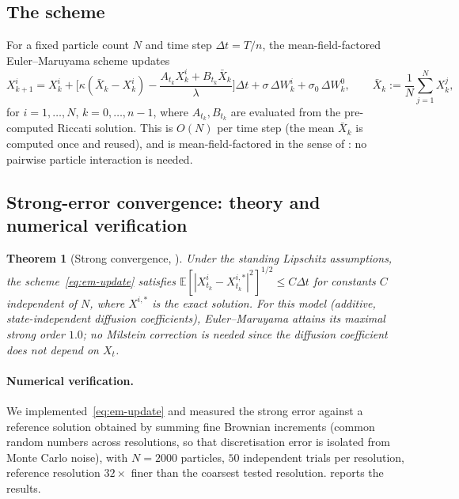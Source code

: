 \documentclass[11pt]{article}
\newtheorem{theorem}{Theorem}[section]
\theoremstyle{remark}
\begin{document}
\subsection{The scheme}

For a fixed particle count $N$ and time step $\Delta t = T/n$, the
mean-field-factored Euler--Maruyama scheme updates
\begin{equation}
    X_{k+1}^i = X_k^i + \Big[\kappa(\bar X_k - X_k^i) -
    \frac{A_{t_k}X_k^i+B_{t_k}\bar X_k}{\lambda}\Big]\Delta t + \sigma\,\Delta
    W_k^i + \sigma_0\,\Delta W_k^0, \qquad \bar X_k := \frac{1}{N}\sum_{j=1}^N
    X_k^j,
    \label{eq:em-update}
\end{equation}
for $i=1,\ldots,N$, $k=0,\ldots,n-1$, where $A_{t_k}, B_{t_k}$ are evaluated from
the pre-computed Riccati solution. This is $O(N)$ per time step (the mean $\bar
X_k$ is computed once and reused), and is mean-field-factored in the sense of
\citet[Ch.~6]{monyimba2026thesis}: no pairwise particle interaction is needed.

\subsection{Strong-error convergence: theory and numerical verification}

\begin{theorem}[Strong convergence, \citealp{monyimba2026paper1}]
\label{thm:em-convergence}
Under the standing Lipschitz assumptions, the scheme~\eqref{eq:em-update} satisfies
$\mathbb{E}[|X_{t_k}^i - X_{t_k}^{i,*}|^2]^{1/2} \le C\Delta t$ for constants $C$
independent of $N$, where $X^{i,*}$ is the exact solution. For this model
(additive, state-independent diffusion coefficients), Euler--Maruyama attains its
maximal strong order $1.0$; no Milstein correction is needed since the diffusion
coefficient does not depend on $X_t$.
\end{theorem}

\paragraph{Numerical verification.} We implemented~\eqref{eq:em-update} and
measured the strong error against a reference solution obtained by summing fine
Brownian increments (common random numbers across resolutions, so that
discretisation error is isolated from Monte Carlo noise), with $N=2000$ particles,
$50$ independent trials per resolution, reference resolution $32\times$ finer than
the coarsest tested resolution.  reports the results.
\end{document}

